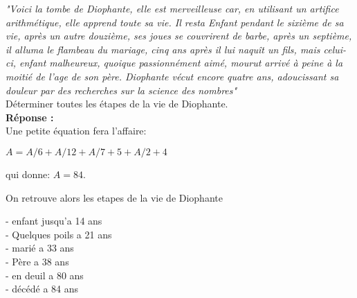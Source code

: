 \textit{"Voici la tombe de Diophante, elle est merveilleuse car, en utilisant un artifice arithmétique, elle apprend toute sa vie. Il resta Enfant pendant le sixième de sa vie, après un autre douzième, ses joues se couvrirent de barbe, après un septième, il alluma le flambeau du mariage, cinq ans après il lui naquît un fils, mais celui-ci, enfant malheureux, quoique passionnément aimé, mourut arrivé à peine à la moitié de l'age de son père. Diophante vécut encore quatre ans, adoucissant sa douleur par des recherches sur la science des nombres"}\\

Déterminer toutes les étapes de la vie de Diophante.\\

\textbf{Réponse :}\\

Une petite équation fera l'affaire:

$A = A/6 + A/12 + A/7 + 5 + A/2 + 4$

qui donne: $A = 84$.

On retrouve alors les etapes de la vie de Diophante

- enfant jusqu'a 14 ans\\

- Quelques poils a 21 ans\\

- marié a 33 ans\\

- Père a 38 ans\\

- en deuil a 80 ans\\

- décédé a 84 ans\\
